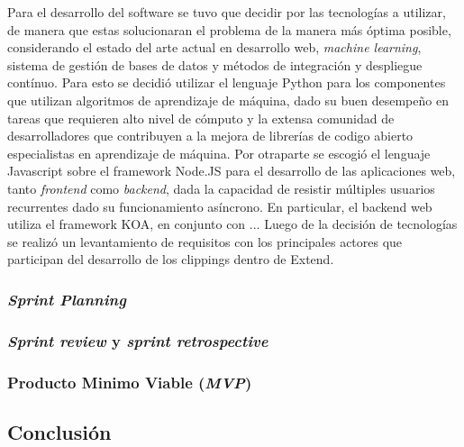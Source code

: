 Para el desarrollo del software se tuvo que decidir por las tecnologías a utilizar, de manera que estas solucionaran el problema de la manera más óptima posible, considerando el estado del arte actual en desarrollo web, \textit{machine learning}, sistema de gestión de bases de datos y métodos de integración y despliegue contínuo. 
Para esto se decidió utilizar el lenguaje Python para los componentes que utilizan algoritmos de aprendizaje de máquina, dado su buen desempeño en tareas que requieren alto nivel de cómputo y la extensa comunidad de desarrolladores que contribuyen a la mejora de librerías de codigo abierto especialistas en aprendizaje de máquina. Por otraparte se escogió el lenguaje Javascript sobre el framework Node.JS para el desarrollo de las aplicaciones web, tanto \textit{frontend} como \textit{backend}, dada la capacidad de resistir múltiples usuarios recurrentes dado su funcionamiento asíncrono. En particular, el backend web utiliza el framework KOA, en conjunto con ...
Luego de la decisión de tecnologías se realizó un levantamiento de requisitos con los principales actores que participan del desarrollo de los clippings dentro de Extend.

\subsubsection{}

\subsubsection{\textit{Sprint Planning}}

\subsubsection{\textit{Sprint review} y \textit{sprint retrospective}}

\subsubsection{Producto Minimo Viable (\textit{MVP})}


\subsection{Conclusión}
